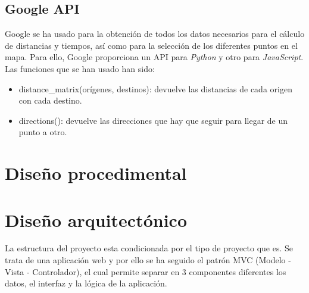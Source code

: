 \subsection{Google API}
Google se ha usado para la obtención de todos los datos necesarios para el cálculo de distancias y tiempos, así como para la selección de los diferentes puntos en el mapa. Para ello, Google proporciona un API para \textit{Python} y otro para \textit{JavaScript}. Las funciones que se han usado han sido:
\begin{itemize}
	\item distance\_matrix(orígenes, destinos): devuelve las distancias de cada origen con cada destino.
	\item directions(): devuelve las direcciones que hay que seguir para llegar de un punto a otro.
\end{itemize}


\section{Diseño procedimental}


\section{Diseño arquitectónico}

La estructura del proyecto esta condicionada por el tipo de proyecto que es. Se trata de una aplicación web y por ello se ha seguido el patrón MVC (Modelo - Vista - Controlador), el cual permite separar en 3 componentes diferentes los datos, el interfaz y la lógica de la aplicación. 

